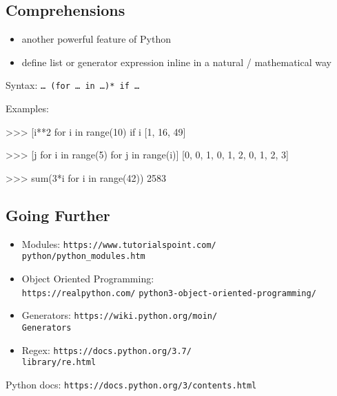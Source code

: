 \documentclass[twocolumn]{article}
\begin{document}
\subsection{Comprehensions}\label{comprehensions}

\begin{itemize}
\item another powerful feature of Python
\item define list or generator expression inline in a natural / mathematical way
\end{itemize}

Syntax: \texttt{\ldots\ (for \ldots\ in \ldots)* if \ldots}

Examples:
\begin{python}
>>> [i**2 for i in range(10) if i %
[1, 16, 49]
\end{python}

\begin{python}
>>> [j for i in range(5) for j in range(i)]
[0, 0, 1, 0, 1, 2, 0, 1, 2, 3]
\end{python}

\begin{python}
>>> sum(3*i for i in range(42))
2583
\end{python}

\subsection{Going Further}\label{further}

\begin{itemize}
\item Modules: \verb$https://www.tutorialspoint.com/$ \\ \verb$python/python_modules.htm$
\item Object Oriented Programming: \\ \verb$https://realpython.com/$ \verb$python3-object-oriented-programming/$
\item Generators: \verb$https://wiki.python.org/moin/$ \\ \verb$Generators$
\item Regex: \verb$https://docs.python.org/3.7/$ \\ \verb$library/re.html$
\end{itemize}

Python docs: \verb$https://docs.python.org/3/contents.html$
\end{document}
